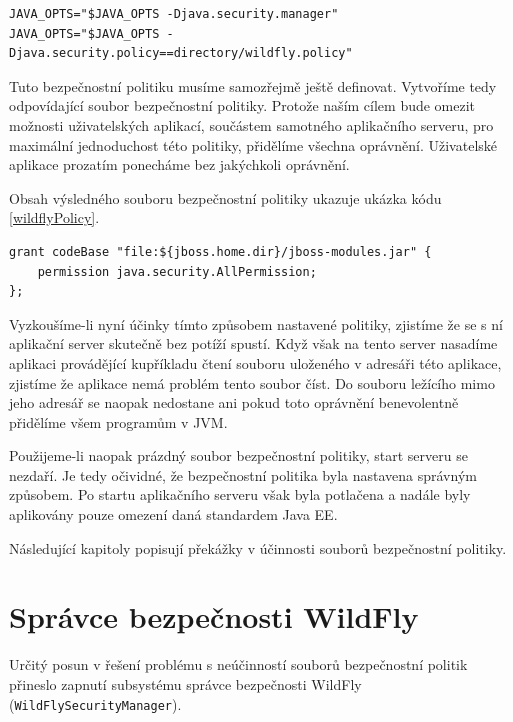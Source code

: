 \begin{lstlisting}[caption=Doplnění spouštěcího skriptu o použití správce bezpečnosti, label=wildflySeSM]
JAVA_OPTS="$JAVA_OPTS -Djava.security.manager"
JAVA_OPTS="$JAVA_OPTS -Djava.security.policy==directory/wildfly.policy"
\end{lstlisting}

Tuto bezpečnostní politiku musíme samozřejmě ještě definovat. Vytvoříme tedy odpovídající soubor bezpečnostní politiky.
Protože naším cílem bude omezit možnosti uživatelských aplikací, součástem samotného aplikačního serveru, pro maximální jednoduchost této politiky, přidělíme všechna oprávnění. Uživatelské aplikace prozatím ponecháme bez jakýchkoli oprávnění.

Obsah výsledného souboru bezpečnostní politiky ukazuje ukázka kódu \ref{wildflyPolicy}.

\begin{lstlisting}[caption=První testovací soubor bezpečnostní politiky pro WildFly, label=wildflyPolicy]
grant codeBase "file:${jboss.home.dir}/jboss-modules.jar" {
    permission java.security.AllPermission;
};
\end{lstlisting}

Vyzkoušíme-li nyní účinky tímto způsobem nastavené politiky, zjistíme že se s ní aplikační server skutečně bez potíží spustí.
Když však na tento server nasadíme aplikaci provádějící kupříkladu čtení souboru uloženého v adresáři této aplikace, zjistíme že aplikace nemá problém tento soubor číst.
Do souboru ležícího mimo jeho adresář se naopak nedostane ani pokud toto oprávnění benevolentně přidělíme všem programům v JVM.

Použijeme-li naopak prázdný soubor bezpečnostní politiky, start serveru se nezdaří.
Je tedy očividné, že bezpečnostní politika byla nastavena správným způsobem.
Po startu aplikačního serveru však byla potlačena a nadále byly aplikovány pouze omezení daná standardem Java EE.

Následující kapitoly popisují překážky v účinnosti souborů bezpečnostní politiky.

\section{Správce bezpečnosti WildFly} \label{wildFlySecurityManager}

Určitý posun v řešení problému s neúčinností souborů bezpečnostní politik přineslo zapnutí subsystému správce bezpečnosti WildFly ({\tt WildFlySecurityManager}).

